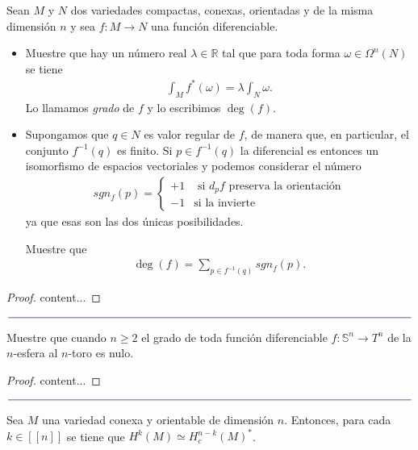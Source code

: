 \documentclass[11pt]{article}
\newcommand{\R}{\mathbb{R}}
\newcommand{\Ss}{\mathbb{S}}
\newcommand{\nat}[1]{[\![#1]\!]}
\newcommand{\paint}[1]{\color{color}{#1}}
\newcommand{\paintline}{\begin{center}
$\paint{
\rule{400pt}{0.5pt}
}$
\vspace{10pt}
\end{center}}
\newenvironment{theorem}[2][Teorema]{\begin{trivlist}
\item[\hskip \labelsep \paint{{\bfseries #1}}\hskip \labelsep {\bfseries #2.}]}{\end{trivlist}}
\newenvironment{exercise}[2][Ejercicio]{\begin{trivlist}
\item[\hskip \labelsep \paint{{\bfseries #1}}\hskip \labelsep {\bfseries #2.}]}{\end{trivlist}}
\begin{document}
\begin{exercise}{2} Sean $M$ y $N$ dos variedades compactas, conexas, orientadas y de la misma dimensión $n$ y sea $f : M \to N$ una función diferenciable.
\begin{itemize}
\item[(a)] Muestre que hay un número real $\lambda \in \R$ tal que para toda forma $\omega \in \Omega^n(N)$ se tiene 
\begin{align*}
\int_Mf^*(\omega) = \lambda\int_N \omega.
\end{align*}
Lo llamamos \textit{grado} de $f$ y lo escribimos $\deg(f)$.
\item[(b)] Supongamos que $q \in N$ es valor regular de $f$, de manera que, en particular, el conjunto $f^{-1}(q)$ es finito. Si $p \in f^{-1}(q)$ la diferencial es entonces un isomorfismo de espacios vectoriales y podemos considerar el número
\begin{align*}
sgn_f(p) = \begin{cases}
+1&\text{ si $d_pf$ preserva la orientación}\\
-1&\text{si la invierte}
\end{cases}
\end{align*}
ya que esas son las dos únicas posibilidades.

Muestre que
\begin{align*}
\deg(f) = \sum_{p \in f^{-1}(q)}sgn_f(p).
\end{align*}
\end{itemize}
\end{exercise}
\begin{proof}
content...
\end{proof}

\paintline

\begin{exercise}{3} Muestre que cuando $n \geq 2$ el grado de toda función diferenciable $f : \Ss^n \to T^n$ de la $n$-esfera al $n$-toro es nulo.
\end{exercise}
\begin{proof}
content...
\end{proof}

\paintline

\begin{theorem}{1 (dualidad de Poincaré)} Sea $M$ una variedad conexa y orientable de dimensión $n$. Entonces, para cada $k \in \nat{n}$ se tiene que $H^k(M) \simeq H^{n-k}_c(M)^*$.
\end{theorem}
\end{document}
